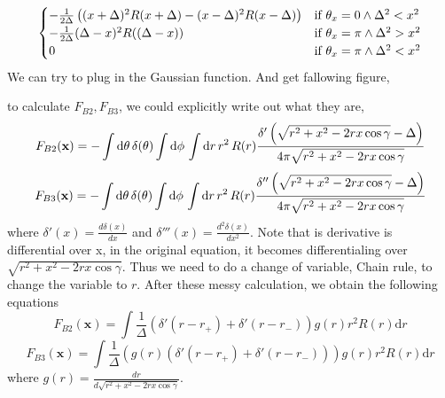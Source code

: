 \documentclass[a4paper,12pt]{article}
\begin{document}
\begin{align}
\begin{cases}
                           - \frac{1}{2\Delta} \left((x + \Delta)^2 R(x + \Delta) - (x - \Delta)^2 R(x - \Delta)\right) & \text{if } \theta_x = 0 \wedge \Delta^2 < x^2 \\
                           - \frac{1}{2\Delta} (\Delta - x)^2 R((\Delta - x)) & \text{if } \theta_x = \pi \wedge \Delta^2 > x^2 \\
                           0 & \text{if } \theta_x = \pi \wedge \Delta^2 < x^2 \\
                       \end{cases} \notag \\
\end{align}
We can try to plug in the Gaussian function. And get fallowing figure,

to calculate \(F_{B2}, F_{B3}\), we could explicitly write out what they are, 
\begin{equation}
    F_{B2}(\mathbf{x}) = - \int \mathrm{d}\theta\, \delta(\theta)  \int \mathrm{d}\phi\, \int \mathrm{d}r\, r^2 \, R(r) \frac{\delta '\left(\sqrt{r^2 + x^2 - 2rx \cos\gamma} - \Delta\right)}{4\pi \sqrt{r^2 + x^2 - 2rx \cos\gamma}} \notag \\
\end{equation}
\begin{equation}
    F_{B3}(\mathbf{x}) = - \int \mathrm{d}\theta\, \delta(\theta)  \int \mathrm{d}\phi\, \int \mathrm{d}r\, r^2 \, R(r) \frac{\delta ''\left(\sqrt{r^2 + x^2 - 2rx \cos\gamma} - \Delta\right)}{4\pi \sqrt{r^2 + x^2 - 2rx \cos\gamma}} \notag \\
\end{equation}
where \(\displaystyle \delta '(x) = \frac{d \delta(x)}{d x}\) and \(\displaystyle \delta '''(x) = \frac{d^2 \delta(x)}{d x^2}\). Note that is derivative is differential over x, in the original equation, it becomes differentialing over \(\sqrt{r^2 + x^2 - 2rx \cos{\gamma}}\). Thus we need to do a change of variable, Chain rule, to change the variable to \(r\). After these messy calculation, we obtain the following equations
\begin{equation}
    F_{B2}(\mathbf{x}) = \int \frac{1}{\Delta}\left(\delta '(r - r_+) + \delta '(r - r_-) \right)g(r) r^2 R(r) \mathrm{d} r 
\end{equation}
\begin{equation}
    F_{B3}(\mathbf{x}) = \int \frac{1}{\Delta}\left(g(r) (\delta '(r - r_+) + \delta '(r - r_-)) \right) g(r) r^2 R(r) \mathrm{d} r 
\end{equation}
where \(g(r) = \frac{d r}{d \sqrt{r^2 + x^2 - 2rx \cos{\gamma}}}\).
\end{document}
